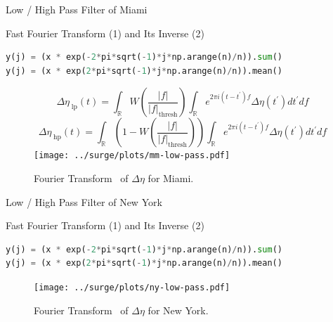 \begin{frame}[fragile]{Low / High Pass Filter of Miami }
\vspace{-10pt}
\begin{block}{Fast Fourier Transform (1) and Its Inverse (2)}
\vspace{-10pt}
\begin{lstlisting}[firstnumber=1, language=python, label=glabels, xleftmargin=0pt]
y(j) = (x * exp(-2*pi*sqrt(-1)*j*np.arange(n)/n)).sum()
y(j) = (x * exp(2*pi*sqrt(-1)*j*np.arange(n)/n)).mean()
\end{lstlisting}
\end{block}
\vspace{-30pt}
\begin{figure}[htb!]
\begin{equation}
\Delta\eta_{\;\mathrm{lp}}(t) = \int_{\mathbb{R}}W\left(\frac{|f|}
{|f|_{\mathrm{thresh}}}\right)\int_{\mathbb{R}}e^{2\pi i (t-t^{\prime})f }
\Delta \eta(t^{\prime})dt^{\prime}df
\end{equation}
\begin{equation}
\Delta\eta_{\;\mathrm{hp}}(t) = \int_{\mathbb{R}}\left(1-W\left(\frac{|f|}
{|f|_{\mathrm{thresh}}}\right)\right)\int_{\mathbb{R}}e^{2\pi i (t-t^{\prime})f}
   \Delta \eta(t^{\prime})dt^{\prime}df
\end{equation}
    \centering
    \texttt{[image: ../surge/plots/mm-low-pass.pdf]}
    \vspace{-15pt}
    \caption{Fourier Transform~\cite{cooley1965algorithm} of $\Delta\eta$ for Miami.}
    \label{fig:A}
\end{figure}
\end{frame}

\begin{frame}[fragile]{Low / High Pass Filter of New York }
\vspace{-30pt}
\begin{block}{Fast Fourier Transform (1) and Its Inverse (2)}
\begin{lstlisting}[firstnumber=1, language=python, label=glabels, xleftmargin=0pt]
y(j) = (x * exp(-2*pi*sqrt(-1)*j*np.arange(n)/n)).sum()
y(j) = (x * exp(2*pi*sqrt(-1)*j*np.arange(n)/n)).mean()
\end{lstlisting}
\end{block}
\vspace{-20pt}
\begin{figure}[htb!]
    \centering
    \texttt{[image: ../surge/plots/ny-low-pass.pdf]}
    \vspace{-7pt}
    \caption{Fourier Transform~\cite{cooley1965algorithm} of $\Delta\eta$ for New York.}
    \label{fig:A}
\end{figure}
\end{frame}


